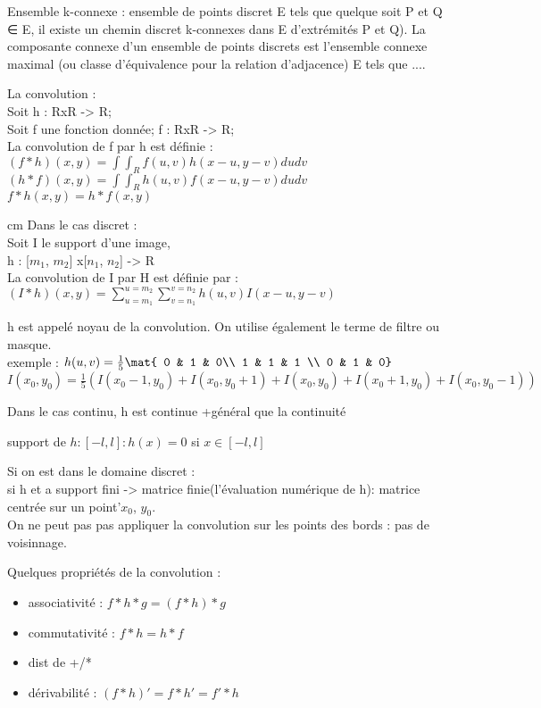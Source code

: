 \documentclass[11pt]{article}
\begin{document}
Ensemble k-connexe : ensemble de points discret E tels que quelque soit P et Q ∈ E, il existe un chemin discret k-connexes dans E d'extrémités P et Q). La composante connexe d'un ensemble de points discrets est l'ensemble connexe maximal (ou classe d'équivalence pour la relation d'adjacence) E tels que ....
\vskip 1cm

La convolution : \\
Soit h : RxR -> R;\\
Soit f une fonction donnée; f : RxR -> R;\\
La convolution de f par h est définie : \\
$(f * h)(x, y) = \int \int_R f(u, v)h(x-u, y - v) dudv$\\
$(h * f)(x, y) = \int \int_R h(u,v)f(x - u, y -v ) du dv$\\
$f * h(x, y) = h * f(x, y)$

 cm
Dans le cas discret :\\
Soit I le support d'une image, \\
h : [$m_1$, $m_2$] x[$n_1$, $n_2$] -> R\\

La convolution de I par H est définie par :\\
$(I * h)(x, y) = \sum^{u=m_2}_{u=m_1}\sum^{v=n_2}_{v=n_1} h(u, v)I(x- u, y-v)$

h est appelé noyau de la convolution. On utilise également le terme de filtre ou masque.\\


exemple :
$h(u, v) = \frac{1}{5}\mat { 0 & 1 & 0\\ 1 & 1 & 1 \\ 0 & 1 & 0}$\\
$I(x_0, y_0) = \frac{1}{5}(
I(x_0 -1, y_0) + I(x_0, y_0+1) + I(x_0, y_0) + I(x_0 +1, y_0) + I(x_0, y_0 -1))$

Dans le cas continu, h est continue {+général que la continuité}

support de $h : [-l, l] : h(x) = 0$ si $x \in [-l, l]$

\vskip 1cm

Si on est dans le domaine discret :\\
si h et a support fini -> matrice finie(l'évaluation numérique de h): matrice centrée sur un point'$x_0$, $y_0$.\\
On ne peut pas pas appliquer la convolution sur les points des bords : pas de voisinnage.


Quelques propriétés de la convolution :
\begin{itemize}
	\item associativité : $f * h * g =(f*h) *g$
	\item commutativité : $f* h = h * f$
	\item dist de +/*
	\item dérivabilité : $(f *h)' = f * h' = f' * h$
\end{itemize}
\end{document}
